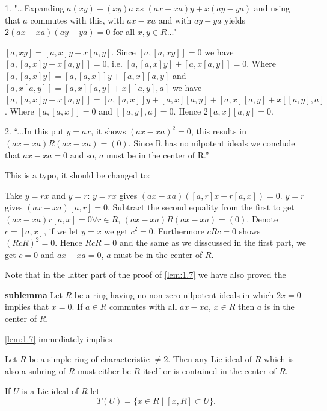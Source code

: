 \documentclass{article}
\begin{document}
\begin{tcolorbox}[colback=gray!20, colframe=black] 

1. "...Expanding $a(xy) - (xy)a$ as $(ax - xa)y + x(ay - ya)$ and using that $a$ commutes with this, with $ax - xa$ and with $ay - ya$ yields $2(ax - xa)(ay - ya) = 0$ for all $x, y \in R$..."

$ [a,xy]=[a,x]y+x[a,y] $. Since $ [a,[a,xy]]=0 $ we have $ [a,[a,x]y+x[a,y]] =0$, i.e. $ [a,[a,x]y]+[a,x[a,y]]=0 $. Where $ [a,[a,x]y]=[a,[a,x]]y+[a,x][a,y] $ and $ [a,x[a,y]]=[a,x][a,y]+x[[a,y],a] $ we have $ [a,[a,x]y+x[a,y]]= [a,[a,x]]y+[a,x][a,y]+[a,x][a,y]+x[[a,y],a]$. Where $[a,[a,x]]=0  $ and $ [[a,y],a]=0 $. Hence $ 2[a,x][a,y]=0 $.

2. ``...In this put $y=ax$, it shows $ (ax-xa)^2=0 $, this results in $(ax - xa)R(ax - xa) = (0)$. Since R has no nilpotent ideals we conclude that $ax - xa = 0$ and so, $a$ must be in the center of R.'' 

This is a typo, it should be changed to:

Take $y = rx$ and $y = r$: $y = rx$ gives $(ax - xa)([a,r]x + r[a,x]) = 0$. $y = r$ gives $(ax - xa)[a,r] = 0$. Subtract the second equality from the first to get $ (ax - xa) r [a,x] = 0 \forall r \in R$, $ (ax - xa) R (ax - xa) = (0)$. Denote $ c=[a,x] $, if we let $ y=x $ we get $ c^2=0 $. Furthermore $ cRc=0 $ shows $ (RcR)^2=0 $. Hence $ RcR =0$ and the same as we disscussed in the first part, we get $ c=0 $ and $ ax - xa = 0 $, $ a $ must be in the center of $ R $.
\end{tcolorbox}

Note that in the latter part of the proof of \ref{lem:1.7} we have also proved the  

\textbf{sublemma}
Let $R$ be a ring having no non-zero nilpotent ideals in which $2x = 0$ implies that $x = 0$. If $a \in R$ commutes with all $ax - xa$, $x \in R$ then $a$ is in the center of $R$.  
 

\ref{lem:1.7} immediately implies

\begin{theorem}\label{thm:1.8} 
Let $ R $ be a simple ring of characteristic $\neq 2$. Then any Lie ideal of $ R $ which is also a subring of $ R $ must either be $ R $ itself or is contained in the center of $ R $.  
\end{theorem}  

\begin{definition}\label{def:1.9}  
If $ U $ is a Lie ideal of $ R $ let  
\[ T(U) = \{x \in R \mid [x, R] \subset U\}. \]  
\end{definition}  
\end{document}
